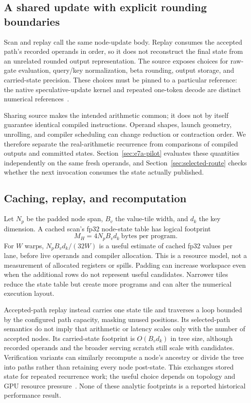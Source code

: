 \documentclass[conference]{IEEEtran}
\begin{document}
\subsection{A shared update with explicit rounding boundaries}
Scan and replay call the same node-update body. Replay consumes the accepted path's recorded operands in order, so it does not reconstruct the final state from an unrelated rounded output representation. The source exposes choices for raw-gate evaluation, query/key normalization, beta rounding, output storage, and carried-state precision. These choices must be pinned to a particular reference: the native speculative-update kernel and repeated one-token decode are distinct numerical references~\cite{lumo2026archive}.

Sharing source makes the intended arithmetic common; it does not by itself guarantee identical compiled instructions. Operand shapes, launch geometry, unrolling, and compiler scheduling can change reduction or contraction order. We therefore separate the real-arithmetic recurrence from comparisons of compiled outputs and committed states. Section~\ref{sec:e7a-pilot} evaluates these quantities independently on the same fresh operands, and Section~\ref{sec:selected-route} checks whether the next invocation consumes the state actually published.

\subsection{Caching, replay, and recomputation}
Let $N_p$ be the padded node span, $B_v$ the value-tile width, and $d_k$ the key dimension. A cached scan's fp32 node-state table has logical footprint
\begin{equation}
 M_H = 4N_pB_vd_k\ \text{bytes per program}.
\end{equation}
For $W$ warps, $N_pB_vd_k/(32W)$ is a useful estimate of cached fp32 values per lane, before live operands and compiler allocation. This is a resource model, not a measurement of allocated registers or spills. Padding can increase workspace even when the additional rows do not represent useful candidates. Narrower tiles reduce the state table but create more programs and can alter the numerical execution layout.

Accepted-path replay instead carries one state tile and traverses a loop bounded by the configured path capacity, masking unused positions. Its selected-path semantics do not imply that arithmetic or latency scales only with the number of accepted nodes. Its carried-state footprint is $O(B_vd_k)$ in tree size, although recorded operands and the broader serving scratch still scale with candidates. Verification variants can similarly recompute a node's ancestry or divide the tree into paths rather than retaining every node post-state. This exchanges stored state for repeated recurrence work; the useful choice depends on topology and GPU resource pressure~\cite{lumo2026archive}. None of these analytic footprints is a reported historical performance result.
\end{document}
